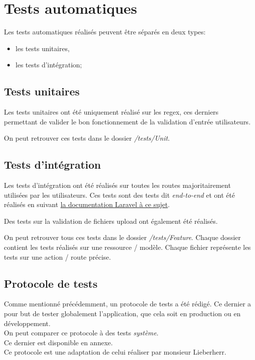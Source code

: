 \documentclass[
    iai, %
    il, %
]{heig-tb}
\begin{document}
\section{Tests automatiques}

Les tests automatiques réalisés peuvent être séparés en deux types:
\begin{itemize}
    \item les tests unitaires,
    \item les tests d'intégration;
\end{itemize}

\subsection{Tests unitaires}
Les tests unitaires ont été uniquement réalisé sur les \Gls{regex}, ces derniers permettant de valider le bon fonctionnement de la validation d'entrée utilisateurs.

On peut retrouver ces tests dans le dossier \emph{/tests/Unit}.

\subsection{Tests d'intégration}
Les tests d'intégration ont été réalisés sur toutes les routes majoritairement utilisées par les utilisateurs. Ces tests sont des tests dit \emph{end-to-end} et ont été réalisés en suivant \href{https://laravel.com/docs/9.x/http-tests}{la documentation Laravel à ce sujet}.

Des tests sur la validation de fichiers upload ont également été réalisés.

On peut retrouver tous ces tests dans le dossier \emph{/tests/Feature}. Chaque dossier contient les tests réalisés sur une ressource / modèle. Chaque fichier représente les tests sur une action / route précise.

\subsection{Protocole de tests}
Comme mentionné précédemment, un protocole de tests a été rédigé. Ce dernier a pour but de tester globalement l'application, que cela soit en production ou en développement. \\
On peut comparer ce protocole à des tests \emph{système}. \\
Ce dernier est disponible en annexe. \\
Ce protocole est une adaptation de celui réaliser par monsieur Lieberherr.
\end{document}
